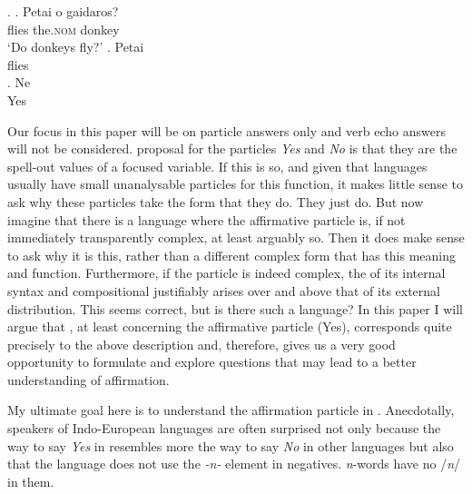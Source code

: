 \documentclass[output=paper]{LSP/langsci}
\begin{document}
\Lsciex.
\ag.  Petai o gaidaros?\\
 flies the.\textsc{nom}  donkey\\
\glt `Do  donkeys fly?'
\bg. Petai\\
     flies\\ \label{vecho}
\cg. Ne\\
Yes\\ \label{particle-answer}
     

Our focus in this paper will be on particle answers only and verb echo answers will not be considered.    proposal for the particles \textit{Yes} and \textit{No} is that they are the spell-out values of a focused  variable.  If this is so, and given that languages usually have small unanalysable particles for this function, it makes little sense to ask why these particles take the form that they do.  They just do.  But now imagine that there is a language where the affirmative particle is, if not immediately transparently complex, at least arguably so.  Then it does make sense to ask why it is this, rather than a different complex form that has this meaning and  function.  Furthermore, if the particle is indeed complex, the  of its internal syntax and compositional  justifiably arises over and above that of its external distribution.  This seems correct, but is there such a language?  In this paper I will argue that , at least concerning the affirmative particle \nai (Yes), corresponds quite precisely to the above description and, therefore, gives us a very good opportunity to formulate and explore questions that may lead to a better understanding of affirmation.

My  ultimate goal here is to understand the affirmation particle \nai in .  Anecdotally, speakers of Indo-European languages are often surprised not only because the way to say \textit{Yes} in  resembles more the way to say \textit{No} in other languages but also that the language does not use the \textit{-n-} element in negatives.   \textit{n}-words have no /\textit{n}/ in them.
\end{document}
